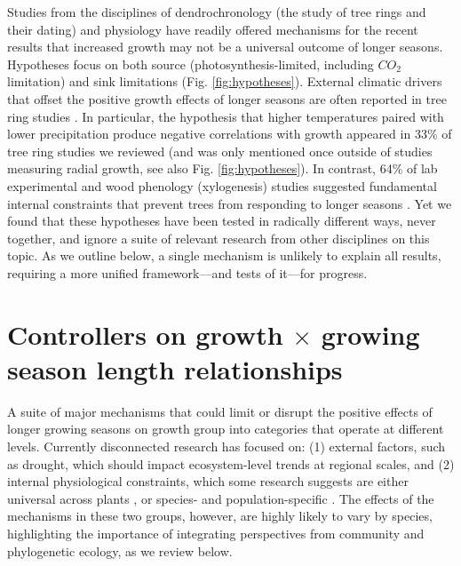 \documentclass[11pt]{article}
\begin{document}
Studies from the disciplines of dendrochronology (the study of tree rings and their dating) and physiology have readily offered mechanisms for the recent results that increased growth may not be a universal outcome of longer seasons. Hypotheses focus on both source (photosynthesis-limited, including $CO_2$ limitation) and sink limitations (Fig. \ref{fig:hypotheses}). External climatic drivers that offset the positive growth effects of longer seasons are often reported in tree ring studies \citep{kolavr2016response,de2022temperature,camarero2022decoupled}. In particular, the hypothesis that higher temperatures paired with lower precipitation produce negative correlations with growth appeared in 33\% of tree ring studies we reviewed (and was only mentioned once outside of studies measuring radial growth, see also Fig. \ref{fig:hypotheses}). In contrast, 64\% of lab experimental and wood phenology (xylogenesis) studies suggested fundamental internal constraints that prevent trees from responding to longer seasons \citep[Fig. \ref{fig:heatmapssupp},][]{cuny2012life,michelot2012comparing,zohner2023effect}. Yet we found that these hypotheses have been tested in radically different ways, never together, and ignore a suite of relevant research from other disciplines on this topic. As we outline below, a single mechanism is unlikely to explain all results, requiring a more unified framework---and tests of it---for progress. 
 
\section*{Controllers on growth $\times$ growing season length relationships}

A suite of major mechanisms that could limit or disrupt the positive effects of longer growing seasons on growth group into categories that operate at different levels. Currently disconnected research has focused on: (1) external factors, such as drought, which should impact ecosystem-level trends at regional scales, and (2) internal physiological constraints, which some research suggests are either universal across plants \citep[e.g.,][]{zohner2023effect}, or species- and population-specific \citep[e.g.,][]{soolanayakanahally2013timing}. The effects of the mechanisms in these two groups, however, are highly likely to vary by species, highlighting the importance of integrating perspectives from community and phylogenetic ecology, as we review below. 
\end{document}

